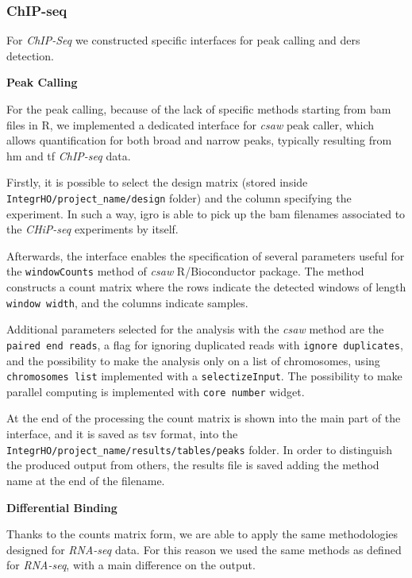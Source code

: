 \subsubsection{ChIP-seq}

For \textit{ChIP-Seq} we constructed specific interfaces for peak calling and \glspl{der} detection.

{\setlength{\parindent}{0cm}\textbf{Peak Calling}}

For the peak calling, because of the lack of specific methods starting from \gls{bam} files in R, we implemented a dedicated interface for \textit{csaw} \cite{Lun2015} peak caller, which allows quantification for both broad and narrow peaks, typically resulting from \gls{hm} and \gls{tf} \textit{ChIP-seq} data.

Firstly, it is possible to select the design matrix (stored inside \lstinline!IntegrHO/project_name/design! folder) and the column specifying the experiment.
In such a way, \gls{igro} is able to pick up the \gls{bam} filenames associated to the \textit{CHiP-seq} experiments by itself.

Afterwards, the interface enables the specification of several parameters useful for the \lstinline!windowCounts! method of \textit{csaw} R/Bioconductor package.
The method constructs a count matrix where the rows indicate the detected windows of length \lstinline!window width!, and the columns indicate samples.

Additional parameters selected for the analysis with the \textit{csaw} method are the \lstinline!paired end reads!, a flag for ignoring duplicated reads with \lstinline!ignore duplicates!, and the possibility to make the analysis only on a list of chromosomes, using \lstinline!chromosomes list! implemented with a \lstinline!selectizeInput!.
The possibility to make parallel computing is implemented with \lstinline!core number! widget.

At the end of the processing the count matrix is shown into the main part of the interface, and it is saved as \gls{tsv} format, into the \lstinline!IntegrHO/project_name/results/tables/peaks! folder.
In order to distinguish the produced output from others, the results file is saved adding the method name at the end of the filename.

{\setlength{\parindent}{0cm}\textbf{Differential Binding}}

Thanks to the counts matrix form, we are able to apply the same methodologies designed for \textit{RNA-seq} data.
For this reason we used the same  methods as defined for \textit{RNA-seq}, with a main difference on the output.

